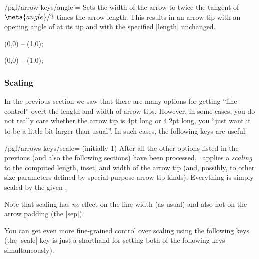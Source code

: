 \begin{key}{/pgf/arrow keys/angle'=}
    Sets the width of the arrow to twice the tangent of $\meta{angle}/2$ times
    the arrow length. This results in an arrow tip with an opening angle of
     at its tip and with the specified |length| unchanged.
\begin{codeexample}[preamble={\usetikzlibrary{arrows.meta}}]
\tikz \draw [arrows = {-Stealth[inset=0pt, length=10pt, angle'=90]}]
            (0,0) -- (1,0);
\end{codeexample}
\begin{codeexample}[preamble={\usetikzlibrary{arrows.meta}}]
\tikz \draw [arrows = {-Stealth[inset=0pt, length=10pt, angle'=30]}]
            (0,0) -- (1,0);
\end{codeexample}
\end{key}


\subsubsection{Scaling}

In the previous section we saw that there are many options for getting ``fine
control'' overt the length and width of arrow tips. However, in some cases, you
do not really care whether the arrow tip is 4pt long or 4.2pt long, you ``just
want it to be a little bit larger than usual''. In such cases, the following
keys are useful:

\begin{key}{/pgf/arrows keys/scale= (initially 1)}
    After all the other options listed in the previous (and also the following
    sections) have been processed, \tikzname\ applies a \emph{scaling} to the
    computed length, inset, and width of the arrow tip (and, possibly, to other
    size parameters defined by special-purpose arrow tip kinds). Everything is
    simply scaled by the given .
\begin{codeexample}[preamble={\usetikzlibrary{arrows.meta}}]
\end{codeexample}
    Note that scaling has \emph{no} effect on the line width (as usual) and
    also not on the arrow padding (the |sep|).
\end{key}

You can get even more fine-grained control over scaling using the following
keys (the |scale| key is just a shorthand for setting both of the following
keys simultaneously):


